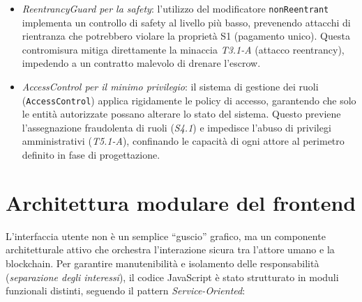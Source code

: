 \begin{itemize}
    \item \textit{ReentrancyGuard per la safety}: l'utilizzo del modificatore \texttt{nonReentrant} implementa un controllo di safety al livello più basso, prevenendo attacchi di rientranza che potrebbero violare la proprietà S1 (pagamento unico). Questa contromisura mitiga direttamente la minaccia \textit{T3.1-A} (attacco reentrancy), impedendo a un contratto malevolo di drenare l'escrow.
    \item \textit{AccessControl per il minimo privilegio}: il sistema di gestione dei ruoli (\texttt{AccessControl}) applica rigidamente le policy di accesso, garantendo che solo le entità autorizzate possano alterare lo stato del sistema. Questo previene l'assegnazione fraudolenta di ruoli (\textit{S4.1}) e impedisce l'abuso di privilegi amministrativi (\textit{T5.1-A}), confinando le capacità di ogni attore al perimetro definito in fase di progettazione.
\end{itemize}

\section{Architettura modulare del frontend}

L'interfaccia utente non è un semplice ``guscio'' grafico, ma un componente architetturale attivo che orchestra l'interazione sicura tra l'attore umano e la blockchain. Per garantire manutenibilità e isolamento delle responsabilità (\textit{separazione degli interessi}), il codice JavaScript è stato strutturato in moduli funzionali distinti, seguendo il pattern \textit{Service-Oriented}:

